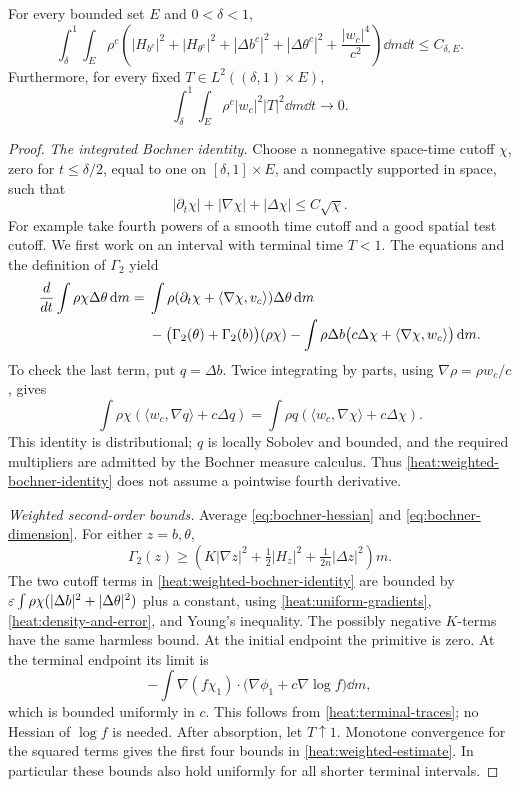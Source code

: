 \begin{lemma}
\label{heat:weighted-estimates}
For every bounded set \(E\) and \(0<\delta<1\),
\begin{equation}
\label{heat:weighted-estimate}
\int_\delta^1\!\int_E\rho^c
\left(|H_{b^c}|^2+|H_{\theta^c}|^2
+|\Delta b^c|^2+|\Delta\theta^c|^2
+\frac{|w_c|^4}{c^2}\right)\dd m\dd t
\le C_{\delta,E}.
\end{equation}
Furthermore, for every fixed \(T\in L^2((\delta,1)\times E)\),
\begin{equation}
\label{heat:weighted-small-w}
\int_\delta^1\!\int_E\rho^c|w_c|^2|T|^2\dd m\dd t
\longrightarrow0.
\end{equation}
\end{lemma}

\begin{proof}
\emph{The integrated Bochner identity.}
Choose a nonnegative space-time cutoff \(\chi\), zero for
\(t\le\delta/2\), equal to one on \([\delta,1]\times E\),
and compactly supported in space, such that
\[
|\partial_t\chi|+|\nabla\chi|+|\Delta\chi|
\le C\sqrt\chi.
\]
For example take fourth powers of a smooth time cutoff and a
good spatial test cutoff. We first work on an interval with
terminal time \(T<1\). The equations and the definition of
\(\Gamma_2\) yield
\begin{align}
\label{heat:weighted-bochner-identity}
\frac d{dt}\int\rho\chi\Delta\theta\,\mathrm d m
={}&\int\rho(\partial_t\chi+
\langle\nabla\chi,v_c\rangle)\Delta\theta\,\mathrm d m\notag\\
&-\bigl(\Gamma_2(\theta)+\Gamma_2(b)\bigr)(\rho\chi)
-\int\rho\Delta b\bigl(c\Delta\chi+
\langle\nabla\chi,w_c\rangle\bigr)\,\mathrm d m.
\end{align}
To check the last term, put \(q=\Delta b\). Twice integrating
by parts, using \(\nabla\rho=\rho w_c/c\), gives
\[
\int\rho\chi(\langle w_c,\nabla q\rangle+c\Delta q)
=\int\rho q(\langle w_c,\nabla\chi\rangle+c\Delta\chi).
\]
This identity is distributional; \(q\) is locally Sobolev and
bounded, and the required multipliers are admitted by the
Bochner measure calculus. Thus
\eqref{heat:weighted-bochner-identity} does not assume a
pointwise fourth derivative.

\emph{Weighted second-order bounds.}
Average \eqref{eq:bochner-hessian} and
\eqref{eq:bochner-dimension}. For either \(z=b,\theta\),
\[
\Gamma_2(z)\ge
\left(K|\nabla z|^2+\tfrac12|H_z|^2+
\tfrac1{2n}|\Delta z|^2\right)m.
\]
The two cutoff terms in
\eqref{heat:weighted-bochner-identity} are bounded by
\(\varepsilon\int\rho\chi(|\Delta b|^2+|\Delta\theta|^2)\)
plus a constant, using \eqref{heat:uniform-gradients},
\eqref{heat:density-and-error}, and Young's inequality.
The possibly negative \(K\)-terms have the same harmless
bound. At the initial endpoint the primitive is zero. At the
terminal endpoint its limit is
\[
-\int\nabla(f\chi_1)\cdot
\bigl(\nabla\phi_1+c\nabla\log f\bigr)\dd m,
\]
which is bounded uniformly in \(c\). This follows from
\eqref{heat:terminal-traces}; no Hessian of \(\log f\) is
needed. After absorption, let \(T\uparrow1\). Monotone
convergence for the squared terms gives the first four bounds
in \eqref{heat:weighted-estimate}. In particular these bounds
also hold uniformly for all shorter terminal intervals.


\end{proof}
